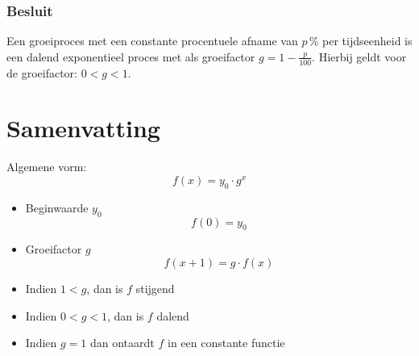 \subsubsection{Besluit}
Een groeiproces met een constante
procentuele afname van $p$\,\% per tijdseenheid is een dalend
exponentieel proces met als groeifactor $ g=1-\frac{p}{100}$.
Hierbij geldt voor de groeifactor: $0<g<1$.

\section{Samenvatting}
\begin{center}
\end{center}
Algemene vorm:
\[
  f(x) = y_0 \cdot g^x
\]
\begin{itemize}
  \item Beginwaarde $y_0$
        \[
          f(0) = y_0
        \]
  \item Groeifactor $g$
        \[
          f(x + 1) = g \cdot f(x)
        \]
  \item Indien $1 < g$, dan is $f$ stijgend
  \item Indien $0 < g < 1$, dan is $f$ dalend
  \item Indien $g=1$ dan ontaardt $f$ in een constante functie
\end{itemize}





